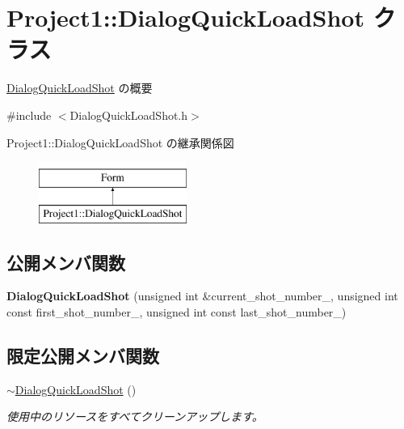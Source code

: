 \hypertarget{class_project1_1_1_dialog_quick_load_shot}{}\section{Project1\+:\+:Dialog\+Quick\+Load\+Shot クラス}
\label{class_project1_1_1_dialog_quick_load_shot}


\hyperlink{class_project1_1_1_dialog_quick_load_shot}{Dialog\+Quick\+Load\+Shot} の概要  




{\ttfamily \#include $<$Dialog\+Quick\+Load\+Shot.\+h$>$}

Project1\+:\+:Dialog\+Quick\+Load\+Shot の継承関係図\begin{figure}[H]
\begin{center}
\leavevmode
\includegraphics[height=2.000000cm]{class_project1_1_1_dialog_quick_load_shot}
\end{center}
\end{figure}
\subsection*{公開メンバ関数}
\begin{DoxyCompactItemize}
\item 
\mbox{\label{class_project1_1_1_dialog_quick_load_shot_abe6182b5f841d94975a9a5d1430f17ae}} 
{\bfseries Dialog\+Quick\+Load\+Shot} (unsigned int \&current\+\_\+shot\+\_\+number\+\_\+, unsigned int const first\+\_\+shot\+\_\+number\+\_\+, unsigned int const last\+\_\+shot\+\_\+number\+\_\+)
\end{DoxyCompactItemize}
\subsection*{限定公開メンバ関数}
\begin{DoxyCompactItemize}
\item 
\hyperlink{class_project1_1_1_dialog_quick_load_shot_affa8c1b282af262ffcd41d67f6509f97}{$\sim$\+Dialog\+Quick\+Load\+Shot} ()
\begin{DoxyCompactList}\small\item\em 使用中のリソースをすべてクリーンアップします。 \end{DoxyCompactList}\end{DoxyCompactItemize}


